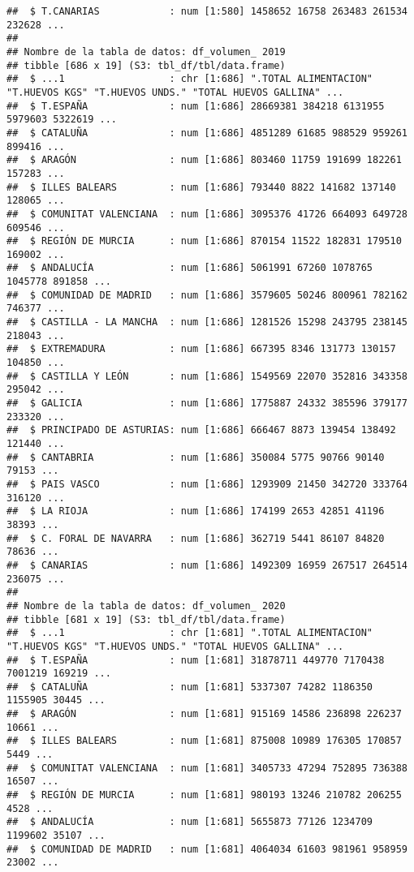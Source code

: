 \documentclass[
]{article}
\begin{document}
\begin{verbatim}
##  $ T.CANARIAS            : num [1:580] 1458652 16758 263483 261534 232628 ...
##  
## Nombre de la tabla de datos: df_volumen_ 2019 
## tibble [686 x 19] (S3: tbl_df/tbl/data.frame)
##  $ ...1                  : chr [1:686] ".TOTAL ALIMENTACION" "T.HUEVOS KGS" "T.HUEVOS UNDS." "TOTAL HUEVOS GALLINA" ...
##  $ T.ESPAÑA              : num [1:686] 28669381 384218 6131955 5979603 5322619 ...
##  $ CATALUÑA              : num [1:686] 4851289 61685 988529 959261 899416 ...
##  $ ARAGÓN                : num [1:686] 803460 11759 191699 182261 157283 ...
##  $ ILLES BALEARS         : num [1:686] 793440 8822 141682 137140 128065 ...
##  $ COMUNITAT VALENCIANA  : num [1:686] 3095376 41726 664093 649728 609546 ...
##  $ REGIÓN DE MURCIA      : num [1:686] 870154 11522 182831 179510 169002 ...
##  $ ANDALUCÍA             : num [1:686] 5061991 67260 1078765 1045778 891858 ...
##  $ COMUNIDAD DE MADRID   : num [1:686] 3579605 50246 800961 782162 746377 ...
##  $ CASTILLA - LA MANCHA  : num [1:686] 1281526 15298 243795 238145 218043 ...
##  $ EXTREMADURA           : num [1:686] 667395 8346 131773 130157 104850 ...
##  $ CASTILLA Y LEÓN       : num [1:686] 1549569 22070 352816 343358 295042 ...
##  $ GALICIA               : num [1:686] 1775887 24332 385596 379177 233320 ...
##  $ PRINCIPADO DE ASTURIAS: num [1:686] 666467 8873 139454 138492 121440 ...
##  $ CANTABRIA             : num [1:686] 350084 5775 90766 90140 79153 ...
##  $ PAIS VASCO            : num [1:686] 1293909 21450 342720 333764 316120 ...
##  $ LA RIOJA              : num [1:686] 174199 2653 42851 41196 38393 ...
##  $ C. FORAL DE NAVARRA   : num [1:686] 362719 5441 86107 84820 78636 ...
##  $ CANARIAS              : num [1:686] 1492309 16959 267517 264514 236075 ...
##  
## Nombre de la tabla de datos: df_volumen_ 2020 
## tibble [681 x 19] (S3: tbl_df/tbl/data.frame)
##  $ ...1                  : chr [1:681] ".TOTAL ALIMENTACION" "T.HUEVOS KGS" "T.HUEVOS UNDS." "TOTAL HUEVOS GALLINA" ...
##  $ T.ESPAÑA              : num [1:681] 31878711 449770 7170438 7001219 169219 ...
##  $ CATALUÑA              : num [1:681] 5337307 74282 1186350 1155905 30445 ...
##  $ ARAGÓN                : num [1:681] 915169 14586 236898 226237 10661 ...
##  $ ILLES BALEARS         : num [1:681] 875008 10989 176305 170857 5449 ...
##  $ COMUNITAT VALENCIANA  : num [1:681] 3405733 47294 752895 736388 16507 ...
##  $ REGIÓN DE MURCIA      : num [1:681] 980193 13246 210782 206255 4528 ...
##  $ ANDALUCÍA             : num [1:681] 5655873 77126 1234709 1199602 35107 ...
##  $ COMUNIDAD DE MADRID   : num [1:681] 4064034 61603 981961 958959 23002 ...

\end{verbatim}
\end{document}
